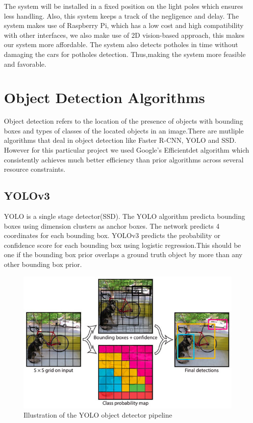 \documentclass[12pt]{report}
\begin{document}
The system will be installed in a fixed position on the light poles which ensures less handling. Also, this system keeps a track of the negligence and delay. The system makes use of Raspberry Pi, which has a low cost and high compatibility with other interfaces, we also make use of 2D vision-based approach, this makes our system more affordable.  The system also detects potholes in time without damaging the cars for potholes detection. Thus,making the system more feasible and favorable.




\section{Object Detection Algorithms}

Object detection refers to the location of the presence of objects with bounding boxes and types of classes of the located objects in an image.There are mutliple algorithms that deal in object detection like Faster R-CNN\cite{CNN}, YOLO\cite{YOLO} and SSD\cite{SSD}. However for this particular project we used Google's Efficientdet algorithm which consistently achieves much better efficiency than prior algorithms across  several resource constraints.

\subsection{YOLOv3}
YOLO is a single stage detector(SSD). The YOLO algorithm predicta bounding boxes using dimension clusters as anchor boxes. The network predicts 4 coordinates for each bounding box. YOLOv3 predicts the probability or confidence score for each bounding box using logistic regression.This should be one if the bounding box prior overlaps a ground truth object by more than any other bounding box prior\cite{YOLO}.

\begin{figure}[H]\includegraphics[scale=0.5]{yolo_design.jpg}\centering\caption{Illustration of the YOLO object detector pipeline\cite{YOLO}} \label{fig:Illustration of the YOLO object detector pipeline} \end{figure}%
\end{document}
